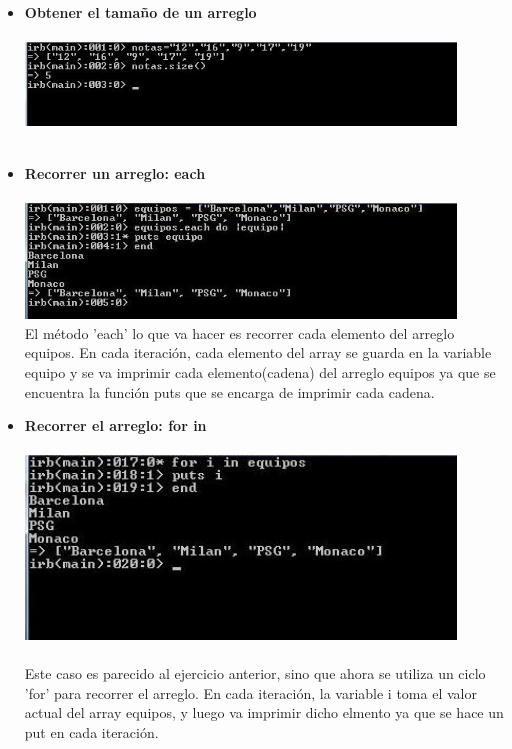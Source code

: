 \documentclass[11pt]{article} %
\begin{document}
\begin{itemize}
    \item  {\bf Obtener el tamaño de un arreglo}\\\\
        \includegraphics[width=0.9\textwidth]{./imagenes/size}\\\\

     \item  {\bf Recorrer un arreglo: each}\\\\
        \includegraphics[width=0.9\textwidth]{./imagenes/each}\\
	
     El método 'each' lo que va hacer es recorrer cada elemento del arreglo equipos. En cada iteración, cada elemento del array se guarda en la variable equipo y se va imprimir cada elemento(cadena) del arreglo equipos ya que se encuentra la función puts que se encarga de        imprimir cada cadena.

     \item {\bf Recorrer el arreglo: for in}\\\\
	    \includegraphics[width=0.9\textwidth]{./imagenes/for}\\\\
     Este caso es parecido al ejercicio anterior, sino que ahora se utiliza un ciclo 'for' para recorrer el arreglo. En cada iteración, la variable i toma el valor actual del array equipos, y luego va imprimir dicho elmento ya que se hace un put en cada iteración.\\



\end{itemize}
\end{document}
